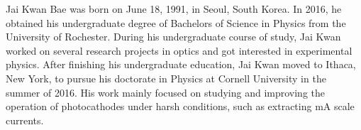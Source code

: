 \begin{biosketch}
Jai Kwan Bae was born on June 18, 1991, in Seoul, South Korea.
In 2016, he obtained his undergraduate degree of Bachelors of Science in Physics from the University of Rochester.
During his undergraduate course of study, Jai Kwan worked on several research projects in optics and got interested in experimental physics.
After finishing his undergraduate education, Jai Kwan moved to Ithaca, New York, to pursue his doctorate in Physics at Cornell University in the summer of 2016.
His work mainly focused on studying and improving the operation of photocathodes under harsh conditions, such as extracting mA scale currents.
\end{biosketch}
